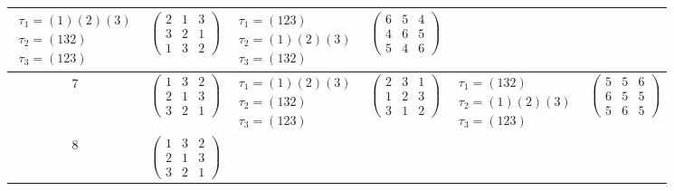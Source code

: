 \begin{longtable}{|c|p{2.7cm}|p{2.5cm}|p{2.7cm}|p{2.5cm}|p{2.7cm}|}
    $\begin{array}{l}\tau_1=(1)(2)(3)\\ \tau_2=(132)\\ \tau_3=(123)\end{array}$ &
    $\begin{pmatrix}2&1&3\\3&2&1\\1&3&2\end{pmatrix}$                           &
    $\begin{array}{l}\tau_1=(123)\\ \tau_2=(1)(2)(3)\\ \tau_3=(132)\end{array}$ &
    $\begin{pmatrix}6&5&4\\4&6&5\\5&4&6\end{pmatrix}$                                                                                                       \\
    \hline
    7                                                                           &
    $\begin{pmatrix}1&3&2\\2&1&3\\3&2&1\end{pmatrix}$                           &
    $\begin{array}{l}\tau_1=(1)(2)(3)\\ \tau_2=(132)\\ \tau_3=(123)\end{array}$ &
    $\begin{pmatrix}2&3&1\\1&2&3\\3&1&2\end{pmatrix}$                           &
    $\begin{array}{l}\tau_1=(132)\\ \tau_2=(1)(2)(3)\\ \tau_3=(123)\end{array}$ &
    $\begin{pmatrix}5&5&6\\6&5&5\\5&6&5\end{pmatrix}$                                                                                                       \\
    \hline
    8                                                                           &
    $\begin{pmatrix}1&3&2\\2&1&3\\3&2&1\end{pmatrix}$                           &

\end{longtable}
